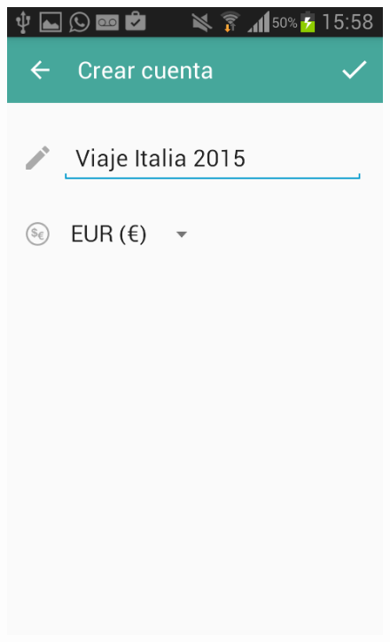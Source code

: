 \begin{figure}[ht]
\centering
\begin{minipage}{.5\textwidth}
  \centering
  \includegraphics[scale=0.30,type=png,ext=.png,read=.png]{imagenes/Screenshots/create_account1}
  \captionsetup{justification=centering}
  \label{fig:interfazCrearCuenta}
\end{minipage}%
\begin{minipage}{.5\textwidth}
\centering

\end{minipage}
\end{figure}
